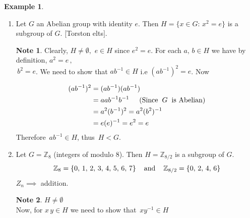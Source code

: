\documentclass[11pt,a4paper]{article}
\theoremstyle{definition}
\newtheorem{exa}[thm]{Example}
\newtheorem*{note}{Note}
\begin{document}
\begin{exa}
\begin{enumerate}
\item Let $G$ an Abelian group with identity $e$. Then $H = \{x\in G:\, x^2 = e\}$ is a subgroup of $G$. $\big[$Torston elts$\big]$.\\

\begin{note}
Clearly, $H\neq \emptyset,\,\, e\in H$ since $e^2 = e$. For each $a, \, b\in H$ we have by definition, $a^2 = e\, ,$\\ $\, b^2 = e$. We need to show that $ab^{-1}\in H$ i.e  $(ab^{-1})^2 = e$. Now
\end{note}
\begin{align*}
(ab^{-1})^2 & = (ab^{-1})(ab^{-1}) \\
            & = aab^{-1}b^{-1}\hspace{0.5cm}(\text{Since}\hspace{0.2cm}G\hspace{0.2cm}\text{is Abelian})\\
            & = a^2 (b^{-1})^2 = a^2(b^2)^{-1}\\
            & = e(e)^{-1} = e^2 = e
\end{align*}
Therefore $\,  ab^{-1}\in H$, thus $\, H<G$.\\

\item Let $G = \mathbb{Z}_8$ (integers of modulo 8). Then $H = \mathbb{Z}_{8/2}$ is a subgroup of $G$.
$$\mathbb{Z}_8 = \{0,\, 1,\, 2,\, 3,\, 4,\, 5,\, 6,\, 7\}\hspace{0.4cm}\text{and}\hspace{0.4cm} \mathbb{Z}_{8/2} = \{0,\, 2,\, 4,\, 6\}$$
$Z_n \implies$ addition.\\


\begin{note}
$H\neq \emptyset$\\
Now, for $x\, y\in H$ we need to show that $\, xy^{-1}\in H$
\end{note}


\end{enumerate}
\end{exa}
\end{document}

